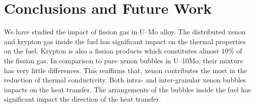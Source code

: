 \chapter{Conclusions and Future Work}
We have studied the impact of fission gas in U--Mo alloy. The distributed xenon and krypton gas inside the fuel has significant impact on the thermal properties on the fuel. Krypton is also a fission products which constitutes almost 10\% of the fission gas. In comparison to pure xenon bubbles in U--10Mo, their mixture has very little differences. This reaffirms that, xenon contributes the most in the reduction of thermal conductivity. Both intra- and inter-granular xenon bubbles impacts on the heat transfer. The arrangements of the bubbles inside the fuel has significant impact the direction of the heat transfer.






